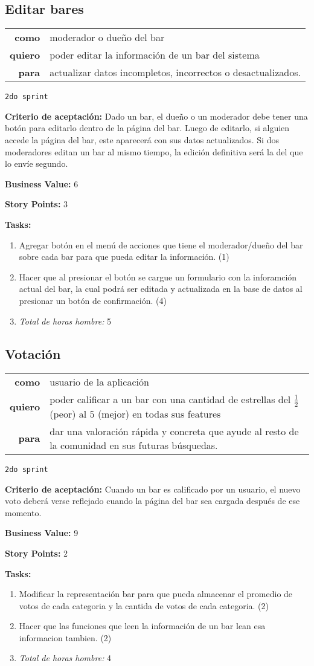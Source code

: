 \documentclass[hidelinks,a4paper,11pt, nofootinbib]{article}
\newcommand{\userstory}[3]{
\begin{tabular}{|r p{10cm}|}
  \hline
  \textbf{como} & #1 \\
  \textbf{quiero} & #2 \\
  \textbf{para} & #3 \\
  \hline
\end{tabular}

}
\newcommand{\critdeacep}[1]{\textbf{Criterio de aceptación:} #1

}
\newcommand{\busvalue}[1]{\textbf{Business Value:} #1

}
\newcommand{\storypoints}[1]{\textbf{Story Points:} #1

}
\newcommand{\segundosprint}{\texttt{2do sprint}

}
\newcommand{\tasks}[1]{\textbf{Tasks:} 

#1}
\begin{document}
\subsection*{Editar bares}
\userstory{moderador o dueño del bar}{poder editar la información de un bar del sistema}{actualizar datos incompletos, incorrectos o desactualizados.
}
\segundosprint
\critdeacep{Dado un bar, el dueño o un moderador debe tener una botón para editarlo dentro de la página del bar. Luego de editarlo, si alguien accede la página del bar, este aparecerá con sus datos actualizados. Si dos moderadores editan un bar al mismo tiempo, la edición definitiva será la del que lo envíe segundo.}
\busvalue{6}
\storypoints{3}
\tasks{
  \begin{enumerate}
    \item Agregar botón en el menú de acciones que tiene el moderador/dueño del bar sobre cada bar para que pueda editar la información. (1)
    \item Hacer que al presionar el botón se cargue un formulario con la inforamción actual del bar, la cual podrá ser editada y actualizada en la base de datos al presionar un botón de confirmación. (4)
    \item[] \textit{Total de horas hombre:} 5
  \end{enumerate}
}
    

\subsection*{Votación}
\userstory{usuario de la aplicación}{poder calificar a un bar con una cantidad de estrellas del $\frac{1}{2}$ (peor) al $5$ (mejor) en todas sus features}{dar una valoración rápida y concreta que ayude al resto de la comunidad en sus futuras búsquedas.}
\segundosprint
\critdeacep{Cuando un bar es calificado por un usuario, el nuevo voto deberá verse reflejado cuando la página del bar sea cargada después de ese momento.}
\busvalue{9}
\storypoints{2}
\tasks{
  \begin{enumerate}
    \item Modificar la representación bar para que pueda almacenar el promedio de votos de cada categoria y la cantida de votos de cada categoria. (2)
    \item Hacer que las funciones que leen la información de un bar lean esa informacion tambien. (2)
    \item[] \textit{Total de horas hombre:} 4
  \end{enumerate}
}
\end{document}
